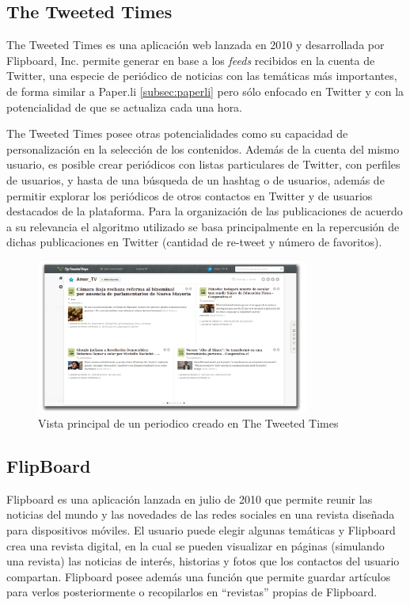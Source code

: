 \subsection{The Tweeted Times}

The Tweeted Times \cite{tweetedtimes} es una aplicación web lanzada en 2010 y desarrollada por Flipboard, Inc. permite generar en base a los \emph{feeds} recibidos en la cuenta de Twitter, una especie de periódico de noticias con las temáticas más importantes, de forma similar a Paper.li \ref{subsec:paperli} pero sólo enfocado en Twitter y con la potencialidad de que se actualiza cada una hora.

The Tweeted Times posee otras potencialidades como su capacidad de personalización en la selección de los contenidos. Además de la cuenta del mismo usuario, es posible crear periódicos con listas particulares de Twitter, con perfiles de usuarios, y hasta de una búsqueda de un hashtag o de usuarios, además de permitir explorar los periódicos de otros contactos en Twitter y de usuarios destacados de la plataforma. Para la organización de las publicaciones de acuerdo a su relevancia el algoritmo utilizado se basa principalmente en la repercusión de dichas publicaciones en Twitter (cantidad de re-tweet y número de favoritos).  

\begin{figure}[H]
	\centering
	\includegraphics[width=0.8\textwidth]{imgs/tweettimes.png}
	\caption{Vista principal de un periodico creado en The Tweeted Times}
	\label{fig:tweetedTime}
\end{figure}

\subsection{FlipBoard}

Flipboard \cite{flipboard} es una aplicación lanzada en julio de 2010 que permite reunir las noticias del mundo y las novedades de las redes sociales en una revista diseñada para dispositivos móviles. El usuario puede elegir algunas temáticas y Flipboard crea una revista digital, en la cual se pueden visualizar en páginas (simulando una revista) las noticias de interés, historias y fotos que los contactos del usuario compartan. Flipboard posee además una función que permite guardar artículos para verlos posteriormente o recopilarlos en “revistas” propias de Flipboard.

